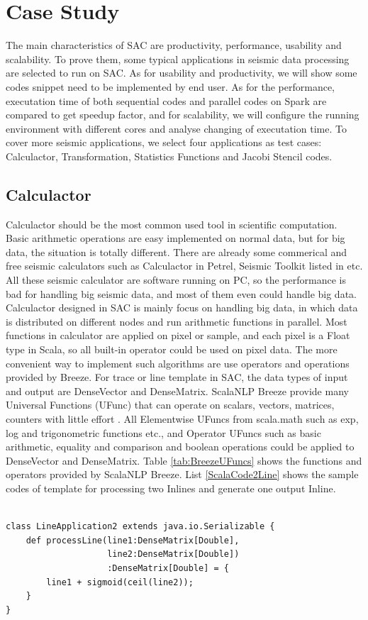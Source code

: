 \section{Case Study}
The main characteristics of SAC are productivity, performance, usability and scalability. To prove them, some typical applications in seismic data processing are selected to run on SAC. As for usability and productivity, we will show some codes snippet need to be implemented by end user. As for the performance, executation time of both sequential codes and parallel codes on Spark are compared to get speedup factor, and for scalability, we will configure the running environment with different cores and analyse changing of executation time. To cover more seismic applications, we select four applications as test cases: Calculactor, Transformation, Statistics Functions and Jacobi Stencil codes.

\subsection{Calculactor}
Calculactor should be the most common used tool in scientific computation. Basic arithmetic operations are easy implemented on normal data, but for big data, the situation is totally different. There are already some commerical and free seismic calculators such as Calculactor in Petrel, Seismic Toolkit listed in \cite{SeismicCalculator} etc. All these seismic calculator are software running on PC, so the performance is bad for handling big seismic data, and most of them even could handle big data. Calculactor designed in SAC is mainly focus on handling big data, in which data is distributed on different nodes and run arithmetic functions in parallel. Most functions in calculator are applied on pixel or sample, and each pixel is a Float type in Scala, so all built-in operator could be used on pixel data. The more convenient way to implement such algorithms are use operators and operations provided by Breeze. For trace or line template in SAC, the data types of input and output are DenseVector and DenseMatrix. ScalaNLP Breeze provide many Universal Functions (UFunc) that can operate on scalars, vectors, matrices, counters with little effort \cite{BreezeUFunc}. All Elementwise UFuncs from scala.math such as exp, log and trigonometric functions etc., and Operator UFuncs such as basic arithmetic, equality and comparison and boolean operations could be applied to DenseVector and DenseMatrix. Table \ref{tab:BreezeUFuncs} shows the functions and operators provided by ScalaNLP Breeze. List \ref{ScalaCode2Line} shows the sample codes of template for processing two Inlines and generate one output Inline.  
\lstset{language=Java,frame=single}
\begin{lstlisting}[float,caption=Sample codes of arighmetic operations on two datasets,label=ScalaCode2Line]

class LineApplication2 extends java.io.Serializable {
    def processLine(line1:DenseMatrix[Double],
                    line2:DenseMatrix[Double])
                    :DenseMatrix[Double] = {
        line1 + sigmoid(ceil(line2)); 
    }
}

\end{lstlisting}

